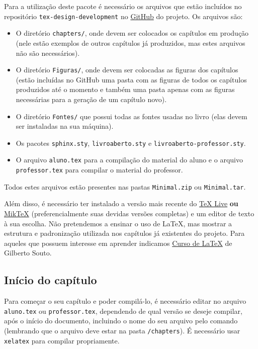
Para a utilização deste pacote é necessário os arquivos que estão incluídos no repositório \verb|tex-design-development| no \href{https://github.com/livro-aberto/tex-design-development/}{GitHub} do projeto. Os arquivos são:
\begin{itemize}
\item O diretório \verb|chapters/|, onde devem ser colocados os capítulos em produção (nele estão exemplos de outros capítulos já produzidos, mas estes arquivos não são necessários).
\item O diretório \verb|Figuras/|, onde devem ser colocadas as figuras dos capítulos (estão incluídas no GitHub uma pasta com as figuras de todos os capítulos produzidos até o momento e também uma pasta apenas com as figuras necessárias para a geração de um capítulo novo).
\item O diretório \verb|Fontes/| que possui todas as fontes usadas no livro (elas devem ser instaladas na sua máquina).
\item Os pacotes \verb|sphinx.sty|, \verb|livroaberto.sty| e \verb|livroaberto-professor.sty|.
\item O arquivo \verb|aluno.tex| para a compilação do material do aluno e o arquivo \verb|professor.tex| para compilar o material do professor.
\end{itemize}

Todos estes arquivos estão presentes nas pastas \verb|Minimal.zip| ou \verb|Minimal.tar|.

Além disso, é necessário ter instalado a versão mais recente do \href{https://www.tug.org/texlive/}{\TeX{} Live} \textbf{ou} \href{https://miktex.org/}{Mik\TeX}{} (preferencialmente suas devidas versões completas) e um editor de texto à sua escolha. Não pretendemos a ensinar o uso de \LaTeX, mas mostrar a estrutura e padronização utilizada nos capítulos já existentes do projeto. Para aqueles que possuem interesse em aprender indicamos \href{http://www.uft.edu.br/engambiental/prof/catalunha/arquivos/latex/latex_GilbertoSouto.pdf}{Curso de \LaTeX{}} de Gilberto Souto. %


\subsection{Início do capítulo}

Para começar o seu capítulo e poder compilá-lo, é necessário editar no arquivo \verb|aluno.tex| ou \verb|professor.tex|, dependendo de qual versão se deseje compilar, após o início do documento, incluindo o nome do seu arquivo pelo comando \verb|| (lembrando que o arquivo deve estar na pasta \verb|/chapters|). É necessário usar \verb|xelatex| para compilar propriamente.

